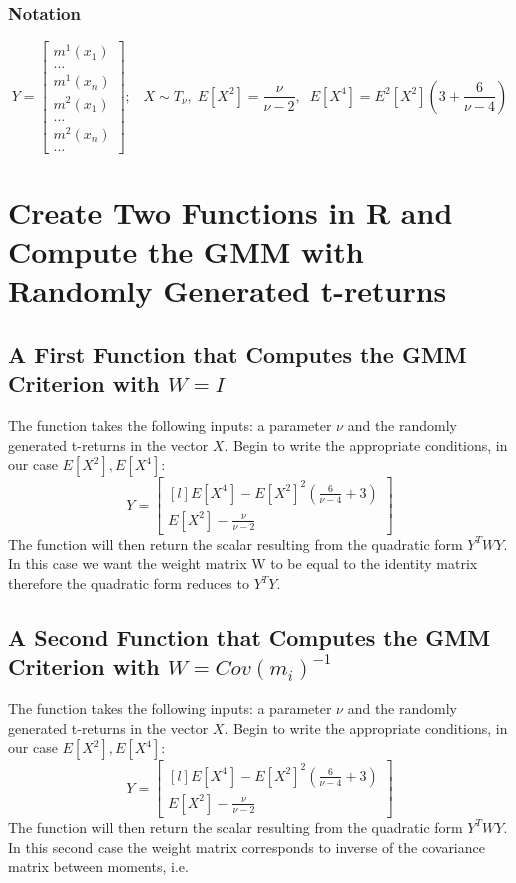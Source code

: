 \subsubsection{Notation}
\begin{equation*}
    Y=
    \begin{bmatrix}
        m^1(x_1)\\
        ...\\
        m^1(x_n)\\
        m^2(x_1)\\
        ...\\
        m^2(x_n)\\
        ...
    \end{bmatrix};\;\;\;
    X \sim T_\nu, \; E[X^2]=\frac{\nu}{\nu-2},\;\;
    E[X^4]=E^2[X^2](3+\frac{6}{\nu-4})
\end{equation*}


\newpage

\section{Create Two Functions in R and Compute the GMM with Randomly Generated t-returns}

\subsection{A First Function that Computes the GMM Criterion with $W=I$}
The function takes the following inputs: a parameter $\nu$ and the randomly generated t-returns in the vector $X$. Begin to write the appropriate conditions, in our case $E[X^2], E[X^4]$:
\begin{equation*}
    Y=    
    \begin{bmatrix}[l]
    E[X^4]-E[X^2]^2(\frac{6}{\nu-4}+3)  \\
    E[X^2]-\frac{\nu}{\nu-2}
    \end{bmatrix}
\end{equation*}
The function will then return the scalar resulting from the quadratic form $Y^TWY$. In this case we want the weight matrix W to be equal to the identity matrix therefore the quadratic form reduces to $Y^TY$.


\subsection{A Second Function that Computes the GMM Criterion with $W=Cov(m_i)^{-1}$}
The function takes the following inputs: a parameter $\nu$ and the randomly generated t-returns in the vector $X$. Begin to write the appropriate conditions, in our case $E[X^2], E[X^4]$:
\begin{equation*}
    Y=    
    \begin{bmatrix}[l]
    E[X^4]-E[X^2]^2(\frac{6}{\nu-4}+3)  \\
    E[X^2]-\frac{\nu}{\nu-2}
    \end{bmatrix}
\end{equation*}
The function will then return the scalar resulting from the quadratic form $Y^T W Y$. In this second case the weight matrix corresponds to inverse of the covariance matrix between moments, i.e.

